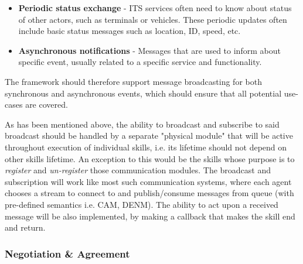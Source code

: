 \documentclass[main.tex]{subfiles}
\begin{document}
\begin{itemize}
    \item \textbf{Periodic status exchange} - ITS services often need to know about 
    status of other actors, such as terminals or vehicles. These periodic updates 
    often include basic status messages such as location, ID, speed, etc.
    \item \textbf{Asynchronous notifications} - Messages that are used to inform 
    about specific event, usually related to a specific service and functionality.
\end{itemize}



The framework should therefore support message broadcasting for both synchronous and 
asynchronous events, which should ensure that all potential use-cases are covered. 

As has been mentioned above, the ability to broadcast and subscribe to said broadcast should be
handled by a separate "physical module" that will be active throughout execution of individual
skills, i.e.  its lifetime should not depend on other skills lifetime. An exception to this
would be the skills whose purpose is to \emph{register} and \emph{un-register} those
communication modules.  The broadcast and subscription will work like most such communication
systems, where each agent chooses a stream to connect to and publish/consume messages from
queue (with pre-defined semantics i.e. CAM, DENM). The ability to act upon a received message
will be also implemented, by making a callback that makes the skill end and return. 

\subsubsection{Negotiation \& Agreement}
\end{document}
